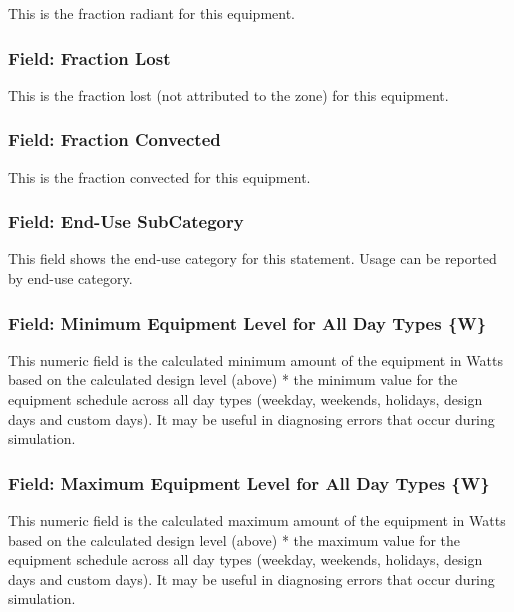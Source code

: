 This is the fraction radiant for this equipment.

\subsubsection{Field: Fraction Lost}\label{field-fraction-lost}

This is the fraction lost (not attributed to the zone) for this equipment.

\subsubsection{Field: Fraction Convected}\label{field-fraction-convected-2}

This is the fraction convected for this equipment.

\subsubsection{Field: End-Use SubCategory}\label{field-end-use-subcategory}

This field shows the end-use category for this statement. Usage can be reported by end-use category.



\subsubsection{Field: Minimum Equipment Level for All Day Types \{W\}}\label{field-minimum-equipment-level-for-all-day-types-w}

This numeric field is the calculated minimum amount of the equipment in Watts based on the calculated design level (above) * the minimum value for the equipment schedule across all day types (weekday, weekends, holidays, design days and custom days). It may be useful in diagnosing errors that occur during simulation.

\subsubsection{Field: Maximum Equipment Level for All Day Types \{W\}}\label{field-maximum-equipment-level-for-all-day-types-w}

This numeric field is the calculated maximum amount of the equipment in Watts based on the calculated design level (above) * the maximum value for the equipment schedule across all day types (weekday, weekends, holidays, design days and custom days). It may be useful in diagnosing errors that occur during simulation.

